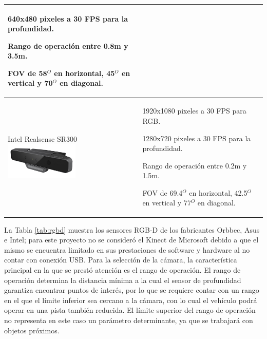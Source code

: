 \begin{table}[htbp!]
\begin{center}
\begin{tabular}{|p{5cm}|p{7cm}|}
\begin{compactitem}
				\item 640x480 pixeles a 30 FPS para la profundidad.
				\item Rango de operación entre 0.8m y 3.5m.
				\item FOV de 58$^{O}$ en horizontal, 45$^{O}$ en vertical y 70$^{O}$ en diagonal.
			\end{compactitem}\\
			\hline
			Intel Realsense SR300 \includegraphics[width=3.5cm]{./Figuras/Intel} &
			\begin{compactitem}
				\item 1920x1080 pixeles a 30 FPS para RGB.
				\item 1280x720 pixeles a 30 FPS para la profundidad.
				\item Rango de operación entre 0.2m y 1.5m.
				\item FOV de 69.4$^{O}$ en horizontal, 42.5$^{O}$ en vertical y 77$^{O}$ en diagonal.
			\end{compactitem}\\
			\hline
		\end{tabular}
	\end{center}
\end{table} 
\par La Tabla \ref{tab:rgbd} muestra los sensores RGB-D de los fabricantes Orbbec, Asus e Intel; para este proyecto no se consideró el Kinect de Microsoft debido a que el mismo se encuentra limitado en sus prestaciones de software y hardware al no contar con conexión USB. Para la selección de la cámara, la característica principal en la que se prestó atención es el rango de operación. El rango de operación determina la distancia mínima a la cual el sensor de profundidad garantiza encontrar puntos de interés, por lo que se requiere contar con un rango en el que el límite inferior sea cercano a la cámara, con lo cual el vehículo podrá operar en una pista también reducida. El límite superior del rango de operación no representa en este caso un parámetro determinante, ya que se trabajará con objetos próximos.
